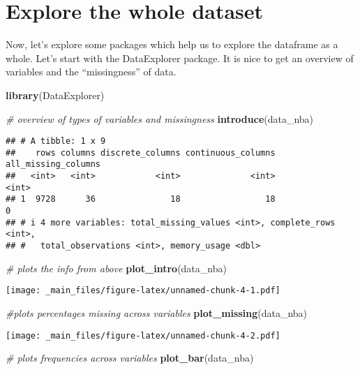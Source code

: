 \documentclass[
]{book}
\newenvironment{Shaded}{\begin{snugshade}}{\end{snugshade}}
\newcommand{\CommentTok}[1]{\textcolor[rgb]{0.56,0.35,0.01}{\textit{#1}}}
\newcommand{\FunctionTok}[1]{\textcolor[rgb]{0.13,0.29,0.53}{\textbf{#1}}}
\newcommand{\NormalTok}[1]{#1}
\begin{document}
\hypertarget{explore-the-whole-dataset}{%
\section{Explore the whole dataset}\label{explore-the-whole-dataset}}

Now, let's explore some packages which help us to explore the dataframe as a whole.
Let's start with the DataExplorer package. It is nice to get an overview of variables and the ``missingness'' of data.

\begin{Shaded}
\begin{Highlighting}[]
\FunctionTok{library}\NormalTok{(DataExplorer)}

\CommentTok{\# overview of types of variables and missingness}
\FunctionTok{introduce}\NormalTok{(data\_nba)}
\end{Highlighting}
\end{Shaded}

\begin{verbatim}
## # A tibble: 1 x 9
##    rows columns discrete_columns continuous_columns all_missing_columns
##   <int>   <int>            <int>              <int>               <int>
## 1  9728      36               18                 18                   0
## # i 4 more variables: total_missing_values <int>, complete_rows <int>,
## #   total_observations <int>, memory_usage <dbl>
\end{verbatim}

\begin{Shaded}
\begin{Highlighting}[]
\CommentTok{\# plots the info from above}
\FunctionTok{plot\_intro}\NormalTok{(data\_nba)}
\end{Highlighting}
\end{Shaded}

\texttt{[image: \_main\_files/figure-latex/unnamed-chunk-4-1.pdf]}

\begin{Shaded}
\begin{Highlighting}[]
\CommentTok{\#plots percentages missing across variables}
\FunctionTok{plot\_missing}\NormalTok{(data\_nba)}
\end{Highlighting}
\end{Shaded}

\texttt{[image: \_main\_files/figure-latex/unnamed-chunk-4-2.pdf]}

\begin{Shaded}
\begin{Highlighting}[]
\CommentTok{\# plots frequencies across variables}
\FunctionTok{plot\_bar}\NormalTok{(data\_nba)}
\end{Highlighting}
\end{Shaded}
\end{document}

